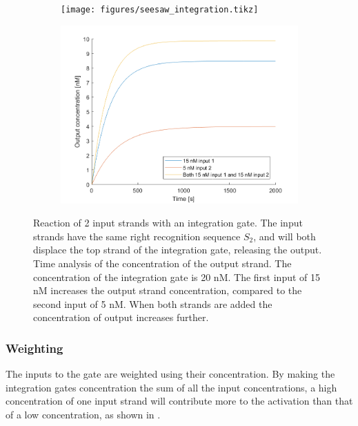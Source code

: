 \begin{figure}[h]
\begin{subfigure}[t]{.49\textwidth}
  \texttt{[image: figures/seesaw\_integration.tikz]}
  \caption{}
  \label{seesaw_integration_reaction}
\end{subfigure}
\hfill
\begin{subfigure}[t]{.49\columnwidth}
  \includegraphics[width=\linewidth]{images/integration}
  \caption{}
  \label{seesaw_integration_time}
\end{subfigure}
\caption{ Reaction of 2 input strands with an integration gate. The input strands have the same right recognition sequence $S_2$, and will both displace the top strand of the integration gate, releasing the output.  Time analysis of the concentration of the output strand. The concentration of the integration gate is 20 nM. The first input of 15 nM increases the output strand concentration, compared to the second input of 5 nM. When both strands are added the concentration of output increases further.}
\label{seesaw_integration}
\end{figure}

\subsubsection{Weighting}
The inputs to the gate are weighted using their concentration. By making the integration gates concentration the sum of all the input concentrations, a high concentration of one input strand will contribute more to the activation than that of a low concentration, as shown in .

